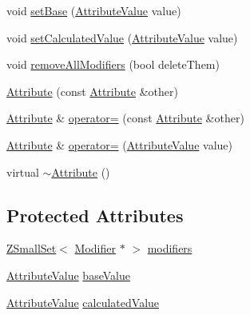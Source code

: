\begin{DoxyCompactItemize}
\item 
void \hyperlink{classZeta_1_1Attribute_a190c07ba11e10554c6819583d7f68317}{set\+Base} (\hyperlink{namespaceZeta_ab5947f98c0ab6302b51f8c6e93ec5581}{Attribute\+Value} value)
\item 
void \hyperlink{classZeta_1_1Attribute_a04ef4458c01cf3fce8731bc4d5a010a2}{set\+Calculated\+Value} (\hyperlink{namespaceZeta_ab5947f98c0ab6302b51f8c6e93ec5581}{Attribute\+Value} value)
\item 
void \hyperlink{classZeta_1_1Attribute_a7728554250846cbef54e9e1e6f141436}{remove\+All\+Modifiers} (bool delete\+Them)
\item 
\hyperlink{classZeta_1_1Attribute_ac564fc00e5396b62e764bd0fe11bbf27}{Attribute} (const \hyperlink{classZeta_1_1Attribute}{Attribute} \&other)
\item 
\hyperlink{classZeta_1_1Attribute}{Attribute} \& \hyperlink{classZeta_1_1Attribute_af57980fcca07e00f0464432f45e011ca}{operator=} (const \hyperlink{classZeta_1_1Attribute}{Attribute} \&other)
\item 
\hyperlink{classZeta_1_1Attribute}{Attribute} \& \hyperlink{classZeta_1_1Attribute_a58360d435e262ee8fb79d4e62242abb7}{operator=} (\hyperlink{namespaceZeta_ab5947f98c0ab6302b51f8c6e93ec5581}{Attribute\+Value} value)
\item 
virtual \hyperlink{classZeta_1_1Attribute_a11b58919e8801749aec2e9e2d933d043}{$\sim$\+Attribute} ()
\end{DoxyCompactItemize}
\subsection*{Protected Attributes}
\begin{DoxyCompactItemize}
\item 
\hyperlink{namespaceZeta_a44c717c98a964d0ebf6ea954cb9c91bf}{Z\+Small\+Set}$<$ \hyperlink{classZeta_1_1Modifier}{Modifier} $\ast$ $>$ \hyperlink{classZeta_1_1Attribute_a340f14d134cb26bf1c8685df3199ffcb}{modifiers}
\item 
\hyperlink{namespaceZeta_ab5947f98c0ab6302b51f8c6e93ec5581}{Attribute\+Value} \hyperlink{classZeta_1_1Attribute_ab96690c561ec9b78648dafc70bc37529}{base\+Value}
\item 
\hyperlink{namespaceZeta_ab5947f98c0ab6302b51f8c6e93ec5581}{Attribute\+Value} \hyperlink{classZeta_1_1Attribute_a76b3de0b3f4037ed5c19d3da82f105d8}{calculated\+Value}
\end{DoxyCompactItemize}


